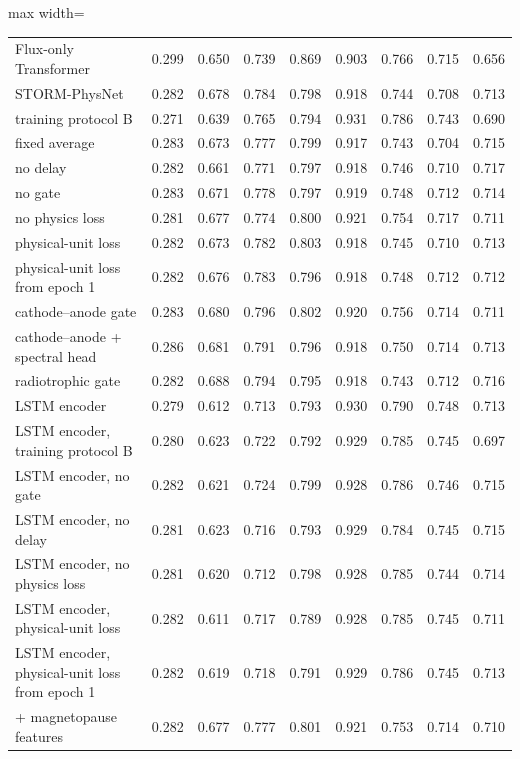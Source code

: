 \begin{table}[!t]
\begin{adjustbox}{max width=\linewidth}
\begin{tabular}{lcccccccc}
Flux-only Transformer & 0.299 & 0.650 & 0.739 & 0.869 & 0.903 & 0.766 & 0.715 & 0.656 \\
STORM-PhysNet & 0.282 & 0.678 & 0.784 & 0.798 & 0.918 & 0.744 & 0.708 & 0.713 \\
\quad training protocol B & 0.271 & 0.639 & 0.765 & 0.794 & 0.931 & 0.786 & 0.743 & 0.690 \\
\quad fixed average & 0.283 & 0.673 & 0.777 & 0.799 & 0.917 & 0.743 & 0.704 & 0.715 \\
\quad no delay & 0.282 & 0.661 & 0.771 & 0.797 & 0.918 & 0.746 & 0.710 & 0.717 \\
\quad no gate & 0.283 & 0.671 & 0.778 & 0.797 & 0.919 & 0.748 & 0.712 & 0.714 \\
\quad no physics loss & 0.281 & 0.677 & 0.774 & 0.800 & 0.921 & 0.754 & 0.717 & 0.711 \\
\quad physical-unit loss & 0.282 & 0.673 & 0.782 & 0.803 & 0.918 & 0.745 & 0.710 & 0.713 \\
\quad physical-unit loss from epoch 1 & 0.282 & 0.676 & 0.783 & 0.796 & 0.918 & 0.748 & 0.712 & 0.712 \\
\quad cathode--anode gate & 0.283 & 0.680 & 0.796 & 0.802 & 0.920 & 0.756 & 0.714 & 0.711 \\
\quad cathode--anode + spectral head & 0.286 & 0.681 & 0.791 & 0.796 & 0.918 & 0.750 & 0.714 & 0.713 \\
\quad radiotrophic gate & 0.282 & 0.688 & 0.794 & 0.795 & 0.918 & 0.743 & 0.712 & 0.716 \\
\quad LSTM encoder & 0.279 & 0.612 & 0.713 & 0.793 & 0.930 & 0.790 & 0.748 & 0.713 \\
\quad LSTM encoder, training protocol B & 0.280 & 0.623 & 0.722 & 0.792 & 0.929 & 0.785 & 0.745 & 0.697 \\
\quad LSTM encoder, no gate & 0.282 & 0.621 & 0.724 & 0.799 & 0.928 & 0.786 & 0.746 & 0.715 \\
\quad LSTM encoder, no delay & 0.281 & 0.623 & 0.716 & 0.793 & 0.929 & 0.784 & 0.745 & 0.715 \\
\quad LSTM encoder, no physics loss & 0.281 & 0.620 & 0.712 & 0.798 & 0.928 & 0.785 & 0.744 & 0.714 \\
\quad LSTM encoder, physical-unit loss & 0.282 & 0.611 & 0.717 & 0.789 & 0.928 & 0.785 & 0.745 & 0.711 \\
\quad LSTM encoder, physical-unit loss from epoch 1 & 0.282 & 0.619 & 0.718 & 0.791 & 0.929 & 0.786 & 0.745 & 0.713 \\
\quad + magnetopause features & 0.282 & 0.677 & 0.777 & 0.801 & 0.921 & 0.753 & 0.714 & 0.710 \\
\bottomrule
\end{tabular}
\end{adjustbox}

\par\vspace{0.5ex}{\footnotesize\raggedright Seed means over the three blocks. Lower RMSE and higher HSS are better.\par}
\end{table}
